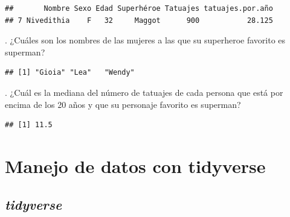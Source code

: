 \documentclass[
]{book}
\newenvironment{Shaded}{\begin{snugshade}}{\end{snugshade}}
\newcommand{\DecValTok}[1]{\textcolor[rgb]{0.00,0.00,0.81}{#1}}
\newcommand{\FunctionTok}[1]{\textcolor[rgb]{0.13,0.29,0.53}{\textbf{#1}}}
\newcommand{\NormalTok}[1]{#1}
\newcommand{\OtherTok}[1]{\textcolor[rgb]{0.56,0.35,0.01}{#1}}
\newcommand{\SpecialCharTok}[1]{\textcolor[rgb]{0.81,0.36,0.00}{\textbf{#1}}}
\newcommand{\StringTok}[1]{\textcolor[rgb]{0.31,0.60,0.02}{#1}}
\begin{document}
\begin{verbatim}
##       Nombre Sexo Edad Superhéroe Tatuajes tatuajes.por.año
## 7 Nivedithia    F   32     Maggot      900           28.125
\end{verbatim}

\hfill{}.
¿Cuáles son los nombres de las mujeres a las que su superheroe favorito es superman?\\

\begin{Shaded}
\end{Shaded}

\begin{verbatim}
## [1] "Gioia" "Lea"   "Wendy"
\end{verbatim}

\hfill{}.
¿Cuál es la mediana del número de tatuajes de cada persona que está por encima de los 20 años y que su personaje favorito es superman?\\

\begin{Shaded}
\end{Shaded}

\begin{verbatim}
## [1] 11.5
\end{verbatim}

\section{Manejo de datos con tidyverse}\label{manejo-de-datos-con-tidyverse}

\subsection{\texorpdfstring{\emph{tidyverse}}{tidyverse}}\label{tidyverse}
\end{document}
